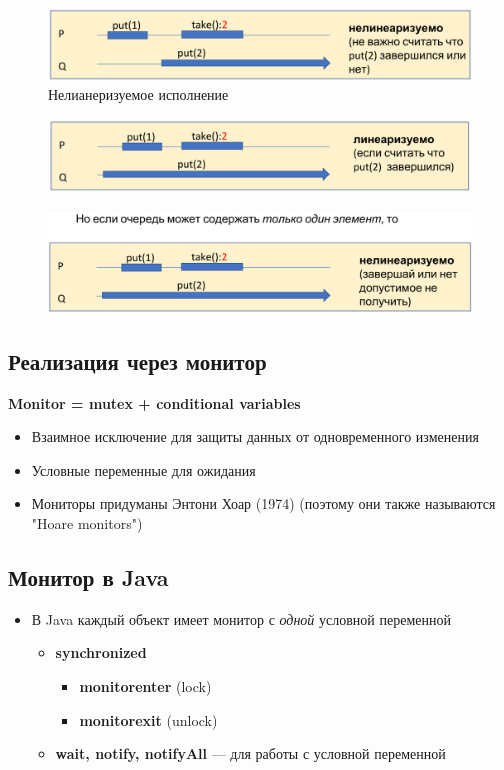 \documentclass[10pt,a4paper,oneside,titlepage]{article}
\theoremstyle{plain}
\theoremstyle{defenition}
\begin{document}
\begin{figure}[h]
	\centering
	\includegraphics[width=0.4\linewidth]{pictures/QueueWait2}
	\caption{Нелианеризуемое исполнение}
	\label{fig:queuewait2}
\end{figure}

\begin{figure}[h!]
	\centering
	\includegraphics[width=0.4\linewidth]{pictures/QueueWait3}
	\caption{}
	\label{fig:queuewait3}
\end{figure}

\begin{figure}[h!]
	\centering
	\includegraphics[width=0.4\linewidth]{pictures/QueueWait4}
	\caption{}
	\label{fig:queuewait4}
\end{figure}

\subsection{Реализация через монитор}
{\bfseries Monitor = mutex + conditional variables}
\begin{itemize}
	\item Взаимное исключение для защиты данных от одновременного изменения
	\item Условные переменные для ожидания
	\item Мониторы придуманы Энтони Хоар (1974) (поэтому они также называются "Hoare monitors")
\end{itemize}

\subsection{Монитор в Java}

\begin{itemize}
	\item В Java каждый объект имеет монитор с \emph{одной} условной переменной
	\begin{itemize}
		\item {\bfseries synchronized}
		\begin{itemize}
			\item {\bfseries monitorenter} (lock)
			\item {\bfseries monitorexit} (unlock)
		\end{itemize}
		\item {\bfseries wait, notify, notifyAll} --- для работы с условной переменной
	\end{itemize}
\end{itemize}
\end{document}
